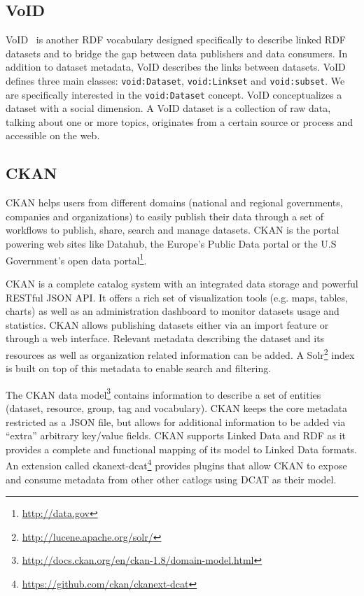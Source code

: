 \subsection{VoID}
VoID~\cite{Bohm:WebSemJournal:11} is another RDF vocabulary designed specifically to describe linked RDF datasets and to bridge the gap between data publishers and data consumers. In addition to dataset metadata, VoID describes the links between datasets. VoID defines three main classes: \texttt{void:Dataset}, \texttt{void:Linkset} and \texttt{void:subset}. We are specifically interested in the \texttt{void:Dataset} concept. VoID conceptualizes a dataset with a social dimension. A VoID dataset is a collection of raw data, talking about one or more topics, originates from a certain source or process and accessible on the web.

\subsection{CKAN}
CKAN helps users from different domains (national and regional governments, companies and organizations) to easily publish their data through a set of workflows to publish, share, search and manage datasets. CKAN is the portal powering web sites like Datahub, the Europe's Public Data portal or the U.S Government's open data portal\footnote{\url{http://data.gov}}.

CKAN is a complete catalog system with an integrated data storage and powerful RESTful JSON API. It offers a rich set of visualization tools (e.g. maps, tables, charts) as well as an administration dashboard to monitor datasets usage and statistics. CKAN allows publishing datasets either via an import feature or through a web interface. Relevant metadata describing the dataset and its resources as well as organization related information can be added. A Solr\footnote{\url{http://lucene.apache.org/solr/}} index is built on top of this metadata to enable search and filtering.

The CKAN data model\footnote{\url{http://docs.ckan.org/en/ckan-1.8/domain-model.html}} contains information to describe a set of entities (dataset, resource, group, tag and vocabulary). CKAN keeps the core metadata restricted as a JSON file, but allows for additional information to be added via ``extra'' arbitrary key/value fields. CKAN supports Linked Data and RDF as it provides a complete and functional mapping of its model to Linked Data formats. An extension called ckanext-dcat\footnote{\url{https://github.com/ckan/ckanext-dcat}} provides plugins that allow CKAN to expose and consume metadata from other other catlogs using DCAT as their model.

